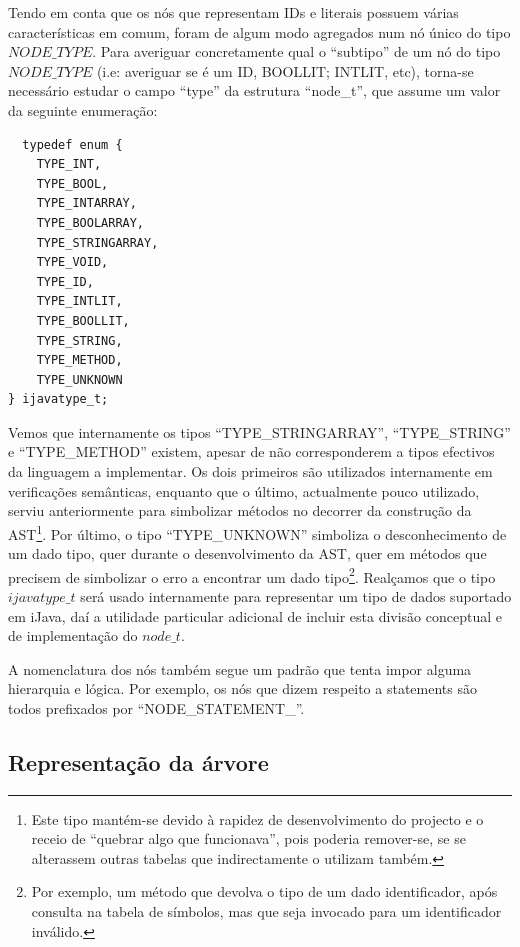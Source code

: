 \documentclass[11pt,a4paper]{article}
\begin{document}
Tendo em conta que os nós que representam IDs e literais possuem várias características em comum, foram de algum modo agregados num nó único do tipo $NODE\_TYPE$. Para averiguar concretamente qual o ``subtipo'' de um nó do tipo $NODE\_TYPE$ (i.e: averiguar se é um ID, BOOLLIT; INTLIT, etc), torna-se necessário estudar o campo ``type'' da estrutura ``node\_t'', que assume um valor da seguinte enumeração:
\begin{lstlisting}
  typedef enum {
    TYPE_INT,
    TYPE_BOOL,
    TYPE_INTARRAY,
    TYPE_BOOLARRAY,
    TYPE_STRINGARRAY,
    TYPE_VOID,
    TYPE_ID,
    TYPE_INTLIT,
    TYPE_BOOLLIT,
    TYPE_STRING,
    TYPE_METHOD,
    TYPE_UNKNOWN
} ijavatype_t;

\end{lstlisting}

Vemos que internamente os tipos ``TYPE\_STRINGARRAY'', ``TYPE\_STRING'' e ``TYPE\_METHOD'' existem, apesar de não corresponderem a tipos efectivos da linguagem a implementar. Os dois primeiros são utilizados internamente em verificações semânticas, enquanto que o último, actualmente pouco utilizado, serviu anteriormente para simbolizar métodos no decorrer da construção da AST\footnote{Este tipo mantém-se devido à rapidez de desenvolvimento do projecto e o receio de ``quebrar algo que funcionava'', pois poderia remover-se, se se alterassem outras tabelas que indirectamente o utilizam também.}. Por último, o tipo ``TYPE\_UNKNOWN'' simboliza o desconhecimento de um dado tipo, quer durante o desenvolvimento da AST, quer em métodos que precisem de simbolizar o erro a encontrar um dado tipo\footnote{Por exemplo, um método que devolva o tipo de um dado identificador, após consulta na tabela de símbolos, mas que seja invocado para um identificador inválido.}. Realçamos que o tipo $ijavatype\_t$ será usado internamente para representar um tipo de dados suportado em iJava, daí a utilidade particular adicional de incluir esta divisão conceptual e de implementação do $node\_t$.

A nomenclatura dos nós também segue um padrão que tenta impor alguma hierarquia e lógica. Por exemplo, os nós que dizem respeito a statements são todos prefixados por ``NODE\_STATEMENT\_''.

\subsection{Representação da árvore}
\end{document}
